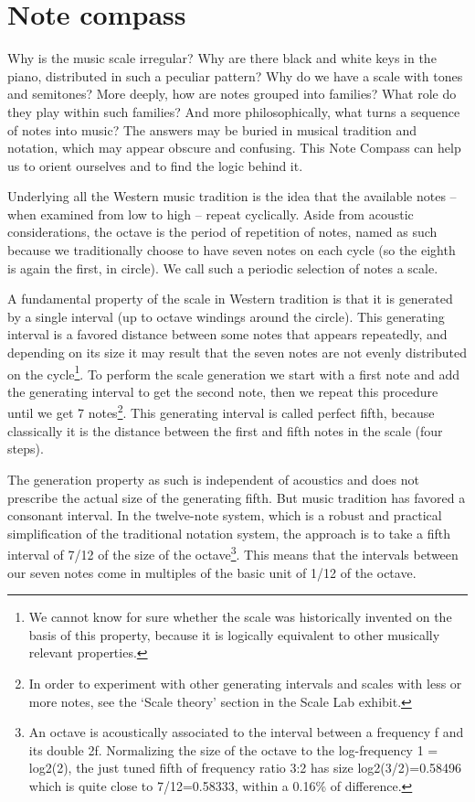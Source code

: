 \section{Note compass }
Why is the music scale irregular? Why are there black and white keys in the piano, distributed in such a peculiar pattern? Why do we have a scale with tones and semitones? More deeply, how are notes grouped into families? What role do they play within such families? And more philosophically, what turns a sequence of notes into music? The answers may be buried in musical tradition and notation, which may appear obscure and confusing. This Note Compass can help us to orient ourselves and to find the logic behind it.

Underlying all the Western music tradition is the idea that the available notes -- when examined from low to high -- repeat cyclically. Aside from acoustic considerations, the octave is the period of repetition of notes, named as such because we traditionally choose to have seven notes on each cycle (so the eighth is again the first, in circle). We call such a periodic selection of notes a scale.

A fundamental property of the scale in Western tradition is that it is generated by a single interval (up to octave windings around the circle). This generating interval is a favored distance between some notes that appears repeatedly, and depending on its size it may result that the seven notes are not evenly distributed on the cycle\footnote{We cannot know for sure whether the scale was historically invented on the basis of this property, because it is logically equivalent to other musically relevant properties.}. To perform the scale generation we start with a first note and add the generating interval to get the second note, then we repeat this procedure until we get 7 notes\footnote{In order to experiment with other generating intervals and scales with less or more notes, see the `Scale theory'
section in the Scale Lab exhibit.}. This generating interval is called perfect fifth, because classically it is the distance between the first and fifth notes in the scale (four steps).

The generation property as such is independent of acoustics and does not prescribe the actual size of the generating fifth. But music tradition has favored a consonant interval. In the twelve-note system, which is a robust and practical simplification of the traditional notation system, the approach is to take a fifth interval of 7/12 of the size of the octave\footnote{An octave is acoustically associated to the interval between a frequency f and its double 2f. Normalizing the size of the octave to the log-frequency 1 = log2(2), the just tuned fifth of frequency ratio 3:2  has size log2(3/2)=0.58496 which is quite close to 7/12=0.58333, within a 0.16\% of difference.}. This means that the intervals between our seven notes come in multiples of the basic unit of 1/12 of the octave.

